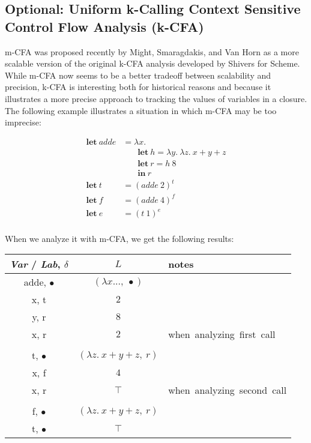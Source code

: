 \documentclass[11pt]{article}
\def\tablespace{\vspace{2ex}}
\begin{document}
\subsection{Optional: Uniform k-Calling Context Sensitive Control Flow Analysis (k-CFA)}

m-CFA was proposed recently by Might, Smaragdakis, and Van Horn as a more scalable version of the original k-CFA analysis developed by Shivers for Scheme.  While m-CFA now seems to be a better tradeoff between scalability and precision, k-CFA is interesting both for historical reasons and because it illustrates a more precise approach to tracking the values of variables in a closure.
%
The following example illustrates a situation in which m-CFA may be too imprecise:

\[
\begin{array}{ll}
\textbf{let}~ \textit{adde} & = \lambda x .\\
                            & ~~~~~~~~ \textbf{let}~ h = \lambda y .~ \lambda z .~ x + y + z\\
                            & ~~~~~~~~ \textbf{let}~ r = h~ 8\\
                            & ~~~~~~~~ \textbf{in}~ r\\
\textbf{let}~ \textit{t} & = (adde~ 2)^{t}\\
\textbf{let}~ \textit{f} & = (adde~ 4)^{f}\\
\textbf{let}~ \textit{e} & = (t~ 1)^{e}\\
\end{array}
\]

When we analyze it with m-CFA, we get the following results:

\tablespace
\begin{tabular}{c | c | l}

\textit{Var} / \textit{Lab}, $\delta$ & $L$ & notes \\
\hline
adde, $\bullet$ & $(\lambda x...,~ \bullet)$ \\
x, t            & $2$ \\
y, r            & $8$ \\
x, r            & $2$ & \mbox{when analyzing first call} \\\\
t, $\bullet$    & $(\lambda z .~ x + y + z,~r)$ \\
x, f            & $4$ \\
x, r            & $\top$ & \mbox{when analyzing second call} \\\\
f, $\bullet$    & $(\lambda z .~ x + y + z,~r)$ \\
t, $\bullet$    & $\top$ \\

\end{tabular}
\tablespace
\end{document}
